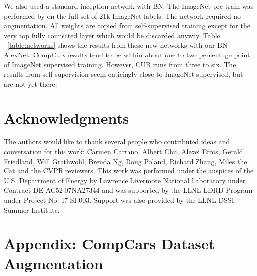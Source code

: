 \documentclass[10pt,twocolumn,letterpaper]{article}
\begin{document}
We also used a standard inception network with BN. The ImageNet pre-train was performed by \cite{Imagenet21k} on the full set of 21k ImageNet labels. The network required no augmentation. All weights are copied from self-supervised training except for the very top fully connected layer which would be discarded anyway.  Table ~\ref{table:networks} shows the results from these new networks with our BN AlexNet. CompCars results tend to be within about one to two percentage point of ImageNet supervised training. However, CUB runs from three to six.  The results from self-supervision seem enticingly close to ImageNet supervised, but are not yet there. 


\section*{Acknowledgments}
The authors would like to thank several people who contributed ideas and conversation for this work: Carmen Carrano, Albert Chu, Alexei Efros, Gerald Friedland, Will Grathwohl, Brenda Ng, Doug Poland, Richard Zhang, Miles the Cat and the CVPR reviewers. This work was performed under the auspices of the U.S. Department of Energy by Lawrence Livermore National Laboratory under Contract DE-AC52-07NA27344 and was supported by the LLNL-LDRD Program under Project No. 17-SI-003. Support was also provided by the LLNL DSSI Summer Institute. 

{\small


}


\clearpage
\appendix
\section{Appendix: CompCars Dataset Augmentation} \label{compcars_appendix}
\end{document}
